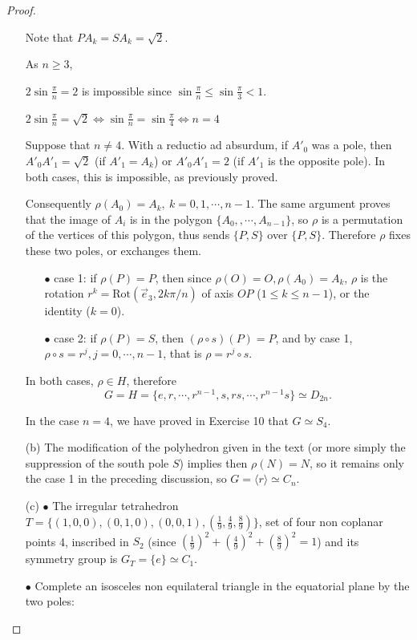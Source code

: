 \documentclass[11pt,a4paper]{article}
\newcommand{\be} {\begin{enumerate}}
\newcommand{\ee} {\end{enumerate}}
\begin{document}
\begin{proof}
\begin{enumerate}
Note that $P A_k = S A_k = \sqrt{2}$.

As $n\geq 3$,

$2 \sin \frac{\pi}{n} = 2$ is impossible since $\sin \frac{\pi}{n} \leq \sin \frac{\pi}{3} <1$.

$2 \sin  \frac{\pi}{n} =  \sqrt{2} \iff  \sin \frac{\pi}{n}  = \sin  \frac{\pi}{4} \iff n=4  $

Suppose that $n\neq 4$. With a reductio ad absurdum, if  $A'_0$ was a pole, then $A'_0A'_1 = \sqrt{2}$ (if $A'_1=A_k$) or $A'_0A'_1 = 2$ (if $A'_1$ is the opposite pole). In both cases, this is impossible, as previously proved.

Consequently $\rho(A_0) = A_k, \ k=0,1,\cdots,n-1$.
The same argument proves that the image of $A_i$ is in the polygon $\{A_0,,\cdots,A_{n-1}\}$, so $\rho$ is a permutation of the vertices of this polygon, thus sends $\{P,S\}$ over $\{P,S\}$. Therefore $\rho$ fixes these two poles, or exchanges them.

\be
\item[$\bullet$] case 1: if $\rho(P) = P$, then since $\rho(O) = O, \rho(A_0)= A_k$, 
$\rho$ is the rotation $r^k = \mathrm{Rot}(\vec{e}_3,  2k\pi/n)$ of axis $OP$ ($1\leq k \leq n-1$), or the identity ($k=0$).


\item[$\bullet$] case 2: if $\rho(P) = S$, then $(\rho \circ s)(P) = P$, and by case 1, $\rho \circ s = r^j, j=0,\cdots,n-1$, that is $\rho = r^j \circ s$.

\ee
In both cases, $\rho \in H$, therefore
$$G = H = \{e,r,\cdots,r^{n-1}, s, rs,\cdots, r^{n-1}s\} \simeq D_{2n}.$$

In the case $n=4$, we have proved in Exercise 10 that $G \simeq S_4$.

\item[(b)]
The modification of the polyhedron given in the text (or more simply the suppression of the south pole $S$) implies then $\rho(N) = N$, so it remains only the case 1 in the preceding discussion, so  $G = \langle r \rangle \simeq C_n$.

\item[(c)]
$\bullet$ The irregular tetrahedron  $T = \{(1,0,0), (0,1,0), (0,0,1), (\frac{1}{9},\frac{4}{9},\frac{8}{9})\}$, set of four non coplanar points 4, inscribed in $S_2$ (since $\left(\frac{1}{9}\right)^2 +\left(\frac{4}{9}\right)^2 +\left(\frac{8}{9}\right)^2  = 1$) and its symmetry group is $G_T = \{e\}\simeq C_1$.

$\bullet$ Complete an isosceles non equilateral triangle  in the equatorial plane by the two poles: 


\end{enumerate}
\end{proof}
\end{document}
